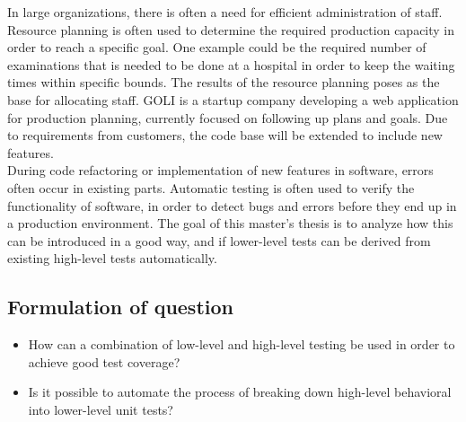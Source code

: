 
In large organizations, there is often a need for efficient
administration of staff. Resource planning is often used to determine
the required production capacity in order to reach a specific goal. One
example could be the required number of examinations that is needed to
be done at a hospital in order to keep the waiting times within specific
bounds. The results of the resource planning poses as the base for
allocating staff. GOLI is a startup company developing a web application
for production planning, currently focused on following up plans and
goals. Due to requirements from customers, the code base will be
extended to include new features.\\

During code refactoring or implementation of new features in software,
errors often occur in existing parts. Automatic testing is often used to
verify the functionality of software, in order to detect bugs and errors
before they end up in a production environment. The goal of this
master's thesis is to analyze how this can be introduced in a good way,
and if lower-level tests can be derived from existing high-level tests
automatically.\\


\subsection{Formulation of question}

\begin{itemize}
    \item How can a combination of low-level and high-level testing be used
          in order to achieve good test coverage?
    \item Is it possible to automate the process of breaking down high-level
          behavioral into lower-level unit tests?
\end{itemize}



